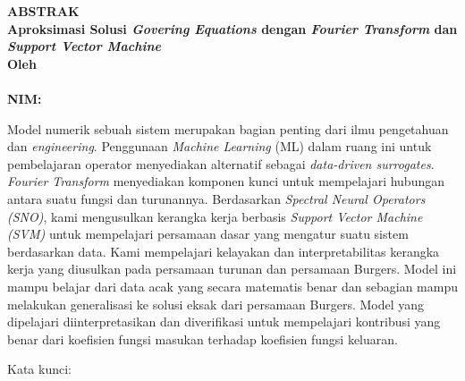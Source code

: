\clearpage
{}
{}
\begin{center}
\textbf{\large  ABSTRAK}\\[0.5cm]
\textbf{\large Aproksimasi Solusi \textit{Govering Equations} dengan \emph{Fourier Transform} dan \textit{Support Vector Machine}}\\[0.5cm]
\textbf{Oleh}\\
\textbf{\penulis}\\
\textbf{NIM: \nim}\\[2em]
\end{center}

\noindent Model numerik sebuah sistem merupakan bagian penting dari ilmu pengetahuan dan \textit{engineering}. Penggunaan \textit{Machine Learning} (ML) dalam ruang ini untuk pembelajaran operator menyediakan alternatif sebagai \textit{data-driven surrogates}. \textit{Fourier Transform} menyediakan komponen kunci untuk mempelajari hubungan antara suatu fungsi dan turunannya. Berdasarkan \textit{Spectral Neural Operators (SNO)}, kami mengusulkan kerangka kerja berbasis \textit{Support Vector Machine (SVM)} untuk mempelajari persamaan dasar yang mengatur suatu sistem berdasarkan data. Kami mempelajari kelayakan dan interpretabilitas kerangka kerja yang diusulkan pada persamaan turunan dan persamaan Burgers. Model ini mampu belajar dari data acak yang secara matematis benar dan sebagian mampu melakukan generalisasi ke solusi eksak dari persamaan Burgers. Model yang dipelajari diinterpretasikan dan diverifikasi untuk mempelajari kontribusi yang benar dari koefisien fungsi masukan terhadap koefisien fungsi keluaran.




\noindent Kata kunci: \katakunci{}
